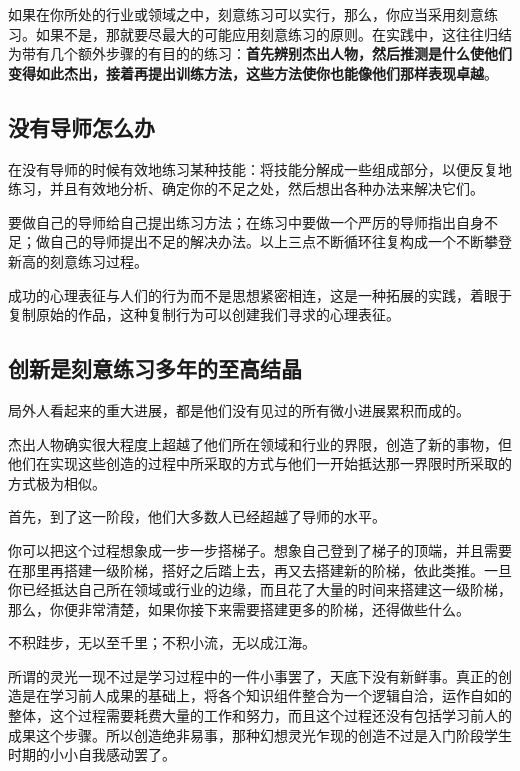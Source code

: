 \documentclass[12pt,oneside]{book}
\begin{document}
如果在你所处的行业或领域之中，刻意练习可以实行，那么，你应当采用刻意练习。如果不是，那就要尽最大的可能应用刻意练习的原则。在实践中，这往往归结为带有几个额外步骤的有目的的练习：\textbf{首先辨别杰出人物，然后推测是什么使他们变得如此杰出，接着再提出训练方法，这些方法使你也能像他们那样表现卓越}。

\subsection{没有导师怎么办}
\begin{bookref}[frametitle={\cite{刻意练习}}]
在没有导师的时候有效地练习某种技能：将技能分解成一些组成部分，以便反复地练习，并且有效地分析、确定你的不足之处，然后想出各种办法来解决它们。
\end{bookref}

要做自己的导师给自己提出练习方法；在练习中要做一个严厉的导师指出自身不足；做自己的导师提出不足的解决办法。以上三点不断循环往复构成一个不断攀登新高的刻意练习过程。

成功的心理表征与人们的行为而不是思想紧密相连，这是一种拓展的实践，着眼于复制原始的作品，这种复制行为可以创建我们寻求的心理表征。

\subsection{创新是刻意练习多年的至高结晶}
\begin{bookref}[frametitle={\cite{刻意练习}}]
局外人看起来的重大进展，都是他们没有见过的所有微小进展累积而成的。

杰出人物确实很大程度上超越了他们所在领域和行业的界限，创造了新的事物，但他们在实现这些创造的过程中所采取的方式与他们一开始抵达那一界限时所采取的方式极为相似。

首先，到了这一阶段，他们大多数人已经超越了导师的水平。

你可以把这个过程想象成一步一步搭梯子。想象自己登到了梯子的顶端，并且需要在那里再搭建一级阶梯，搭好之后踏上去，再又去搭建新的阶梯，依此类推。一旦你已经抵达自己所在领域或行业的边缘，而且花了大量的时间来搭建这一级阶梯，那么，你便非常清楚，如果你接下来需要搭建更多的阶梯，还得做些什么。

不积跬步，无以至千里；不积小流，无以成江海。
\end{bookref}

所谓的灵光一现不过是学习过程中的一件小事罢了，天底下没有新鲜事。真正的创造是在学习前人成果的基础上，将各个知识组件整合为一个逻辑自洽，运作自如的整体，这个过程需要耗费大量的工作和努力，而且这个过程还没有包括学习前人的成果这个步骤。所以创造绝非易事，那种幻想灵光乍现的创造不过是入门阶段学生时期的小小自我感动罢了。
\end{document}
